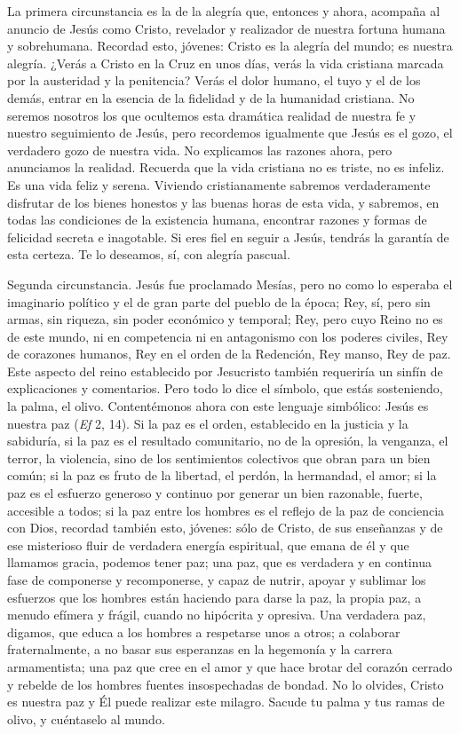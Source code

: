 \begin{body}
La primera circunstancia es la de la alegría que, entonces y ahora, acompaña al anuncio de Jesús como Cristo, revelador y realizador de nuestra fortuna humana y sobrehumana. Recordad esto, jóvenes: Cristo es la alegría del mundo; es nuestra alegría. ¿Verás a Cristo en la Cruz en unos días, verás la vida cristiana marcada por la austeridad y la penitencia? Verás el dolor humano, el tuyo y el de los demás, entrar en la esencia de la fidelidad y de la humanidad cristiana. No seremos nosotros los que ocultemos esta dramática realidad de nuestra fe y nuestro seguimiento de Jesús, pero recordemos igualmente que Jesús es el gozo, el verdadero gozo de nuestra vida. No explicamos las razones ahora, pero anunciamos la realidad. Recuerda que la vida cristiana no es triste, no es infeliz. Es una vida feliz y serena. Viviendo cristianamente sabremos verdaderamente disfrutar de los bienes honestos y las buenas horas de esta vida, y sabremos, en todas las condiciones de la existencia humana, encontrar razones y formas de felicidad secreta e inagotable. Si eres fiel en seguir a Jesús, tendrás la garantía de esta certeza. Te lo deseamos, sí, con alegría pascual.


Segunda circunstancia. Jesús fue proclamado Mesías, pero no como lo esperaba el imaginario político y el  de gran parte del pueblo de la época; Rey, sí, pero sin armas, sin riqueza, sin poder económico y temporal; Rey, pero cuyo Reino no es de este mundo, ni en competencia ni en antagonismo con los poderes civiles, Rey de corazones humanos, Rey en el orden de la Redención, Rey manso, Rey de paz. Este aspecto del reino establecido por Jesucristo también requeriría un sinfín de explicaciones y comentarios. Pero todo lo dice el símbolo, que estás sosteniendo, la palma, el olivo. Contentémonos ahora con este lenguaje simbólico: Jesús es nuestra paz (\textit{Ef} 2, 14). Si la paz es el orden, establecido en la justicia y la sabiduría, si la paz es el resultado comunitario, no de la opresión, la venganza, el terror, la violencia, sino de los sentimientos colectivos que obran para un bien común; si la paz es fruto de la libertad, el perdón, la hermandad, el amor; si la paz es el esfuerzo generoso y continuo por generar un bien razonable, fuerte, accesible a todos; si la paz entre los hombres es el reflejo de la paz de conciencia con Dios, recordad también esto, jóvenes: sólo de Cristo, de sus enseñanzas y de ese misterioso fluir de verdadera energía espiritual, que emana de él y que llamamos gracia, podemos tener paz; una paz, que es verdadera y en continua fase de componerse y recomponerse, y capaz de nutrir, apoyar y sublimar los esfuerzos que los hombres están haciendo para darse la paz, la propia paz, a menudo efímera y frágil, cuando no hipócrita y opresiva. Una verdadera paz, digamos, que educa a los hombres a respetarse unos a otros; a colaborar fraternalmente, a no basar sus esperanzas en la hegemonía y la carrera armamentista; una paz que cree en el amor y que hace brotar del corazón cerrado y rebelde de los hombres fuentes insospechadas de bondad. No lo olvides, Cristo es nuestra paz y Él puede realizar este milagro. Sacude tu palma y tus ramas de olivo, y cuéntaselo al mundo.


\end{body}

